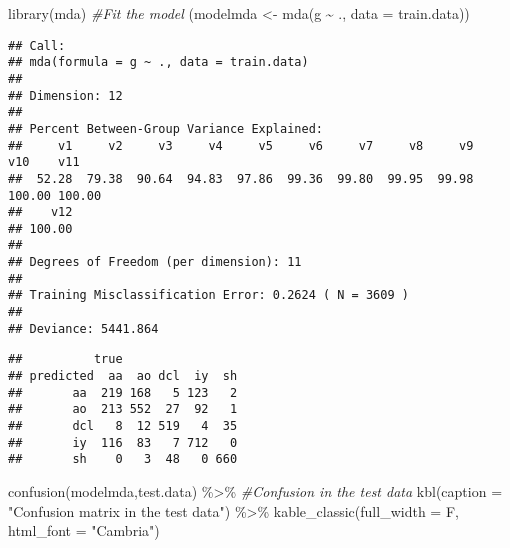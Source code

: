 \documentclass[
]{article}
\newenvironment{Shaded}{\begin{snugshade}}{\end{snugshade}}
\newcommand{\AttributeTok}[1]{\textcolor[rgb]{0.77,0.63,0.00}{#1}}
\newcommand{\CommentTok}[1]{\textcolor[rgb]{0.56,0.35,0.01}{\textit{#1}}}
\newcommand{\FunctionTok}[1]{\textcolor[rgb]{0.00,0.00,0.00}{#1}}
\newcommand{\NormalTok}[1]{#1}
\newcommand{\OtherTok}[1]{\textcolor[rgb]{0.56,0.35,0.01}{#1}}
\newcommand{\SpecialCharTok}[1]{\textcolor[rgb]{0.00,0.00,0.00}{#1}}
\newcommand{\StringTok}[1]{\textcolor[rgb]{0.31,0.60,0.02}{#1}}
\begin{document}
\begin{Shaded}
\begin{Highlighting}[]
\FunctionTok{library}\NormalTok{(mda)}
\CommentTok{\#Fit the model}
\NormalTok{(modelmda }\OtherTok{\textless{}{-}} \FunctionTok{mda}\NormalTok{(g }\SpecialCharTok{\textasciitilde{}}\NormalTok{ ., }\AttributeTok{data =}\NormalTok{ train.data))}
\end{Highlighting}
\end{Shaded}

\begin{verbatim}
## Call:
## mda(formula = g ~ ., data = train.data)
## 
## Dimension: 12 
## 
## Percent Between-Group Variance Explained:
##     v1     v2     v3     v4     v5     v6     v7     v8     v9    v10    v11 
##  52.28  79.38  90.64  94.83  97.86  99.36  99.80  99.95  99.98 100.00 100.00 
##    v12 
## 100.00 
## 
## Degrees of Freedom (per dimension): 11 
## 
## Training Misclassification Error: 0.2624 ( N = 3609 )
## 
## Deviance: 5441.864
\end{verbatim}

\begin{Shaded}
\end{Shaded}

\begin{verbatim}
##          true
## predicted  aa  ao dcl  iy  sh
##       aa  219 168   5 123   2
##       ao  213 552  27  92   1
##       dcl   8  12 519   4  35
##       iy  116  83   7 712   0
##       sh    0   3  48   0 660
\end{verbatim}

\begin{Shaded}
\begin{Highlighting}[]
\FunctionTok{confusion}\NormalTok{(modelmda,test.data) }\SpecialCharTok{\%\textgreater{}\%} \CommentTok{\#Confusion in the test data }
  \FunctionTok{kbl}\NormalTok{(}\AttributeTok{caption =} \StringTok{"Confusion matrix in the test data"}\NormalTok{) }\SpecialCharTok{\%\textgreater{}\%}
  \FunctionTok{kable\_classic}\NormalTok{(}\AttributeTok{full\_width =}\NormalTok{ F, }\AttributeTok{html\_font =} \StringTok{"Cambria"}\NormalTok{)}
\end{Highlighting}
\end{Shaded}
\end{document}
